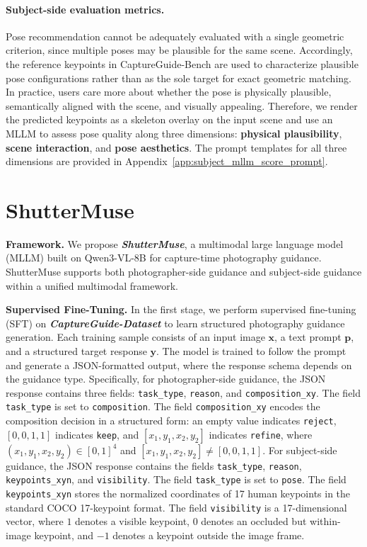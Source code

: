 \documentclass{article} %
\begin{document}
\paragraph{Subject-side evaluation metrics.}
Pose recommendation cannot be adequately evaluated with a single geometric criterion, since multiple poses may be plausible for the same scene. Accordingly, the reference keypoints in CaptureGuide-Bench are used to characterize plausible pose configurations rather than as the sole target for exact geometric matching. In practice, users care more about whether the pose is physically plausible, semantically aligned with the scene, and visually appealing. Therefore, we render the predicted keypoints as a skeleton overlay on the input scene and use an MLLM to assess pose quality along three dimensions: \textbf{physical plausibility}, \textbf{scene interaction}, and \textbf{pose aesthetics}. The prompt templates for all three dimensions are provided in Appendix~\ref{app:subject_mllm_score_prompt}.
\section{ShutterMuse}

\textbf{Framework.}
We propose \textbf{\textit{ShutterMuse}}, a multimodal large language model (MLLM) built on Qwen3-VL-8B \cite{bai2025qwen3} for capture-time photography guidance. ShutterMuse supports both photographer-side guidance and subject-side guidance within a unified multimodal framework.

\textbf{Supervised Fine-Tuning.}
In the first stage, we perform supervised fine-tuning (SFT) on \textbf{\textit{CaptureGuide-Dataset}} to learn structured photography guidance generation. Each training sample consists of an input image $\mathbf{x}$, a text prompt $\mathbf{p}$, and a structured target response $\mathbf{y}$. The model is trained to follow the prompt and generate a JSON-formatted output, where the response schema depends on the guidance type. Specifically, for photographer-side guidance, the JSON response contains three fields: \texttt{task\_type}, \texttt{reason}, and \texttt{composition\_xy}. The field \texttt{task\_type} is set to \texttt{composition}. The field \texttt{composition\_xy} encodes the composition decision in a structured form: an empty value indicates \texttt{reject}, $[0,0,1,1]$ indicates \texttt{keep}, and $[x_1,y_1,x_2,y_2]$ indicates \texttt{refine}, where $(x_1,y_1,x_2,y_2)\in[0,1]^4$ and $[x_1,y_1,x_2,y_2]\neq[0,0,1,1]$. For subject-side guidance, the JSON response contains the fields \texttt{task\_type}, \texttt{reason}, \texttt{keypoints\_xyn}, and \texttt{visibility}. The field \texttt{task\_type} is set to \texttt{pose}. The field \texttt{keypoints\_xyn} stores the normalized coordinates of 17 human keypoints in the standard COCO 17-keypoint format. The field \texttt{visibility} is a 17-dimensional vector, where $1$ denotes a visible keypoint, $0$ denotes an occluded but within-image keypoint, and $-1$ denotes a keypoint outside the image frame.
\end{document}
